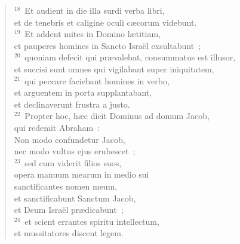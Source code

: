 \begin{flushleft}
\begin{verse}
${}^{18}$~Et audient in die illa surdi verba libri,\\ et de tenebris et caligine oculi c\ae corum videbunt.\\
${}^{19}$~Et addent mites in Domino l\ae titiam,\\ et pauperes homines in Sancto Isra\"el exsultabunt~;\\
${}^{20}$~quoniam defecit qui pr\ae valebat, consummatus est illusor,\\ et succisi sunt omnes qui vigilabant super iniquitatem,\\
${}^{21}$~qui peccare faciebant homines in verbo,\\ et arguentem in porta supplantabant,\\ et declinaverunt frustra a justo.\\
${}^{22}$~Propter hoc, h\ae c dicit Dominus ad domum Jacob,\\ qui redemit Abraham~:\\ Non modo confundetur Jacob,\\ nec modo vultus ejus erubescet~;\\
${}^{23}$~sed cum viderit filios suos,\\ opera manuum mearum in medio sui\\ sanctificantes nomen meum,\\ et sanctificabunt Sanctum Jacob,\\ et Deum Isra\"el pr\ae dicabunt~;\\
${}^{24}$~et scient errantes spiritu intellectum,\\ et mussitatores discent legem.\end{verse}\end{flushleft}


